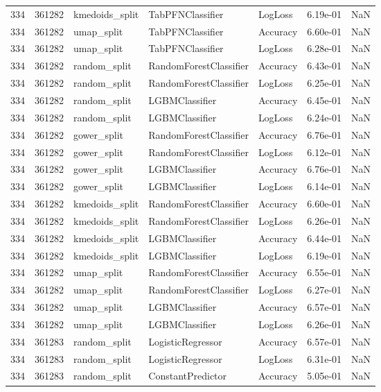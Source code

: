 \begin{tabular}{rrlllrr}
334 & 361282 & kmedoids\_split & TabPFNClassifier & LogLoss & 6.19e-01 & NaN \\
334 & 361282 & umap\_split & TabPFNClassifier & Accuracy & 6.60e-01 & NaN \\
334 & 361282 & umap\_split & TabPFNClassifier & LogLoss & 6.28e-01 & NaN \\
334 & 361282 & random\_split & RandomForestClassifier & Accuracy & 6.43e-01 & NaN \\
334 & 361282 & random\_split & RandomForestClassifier & LogLoss & 6.25e-01 & NaN \\
334 & 361282 & random\_split & LGBMClassifier & Accuracy & 6.45e-01 & NaN \\
334 & 361282 & random\_split & LGBMClassifier & LogLoss & 6.24e-01 & NaN \\
334 & 361282 & gower\_split & RandomForestClassifier & Accuracy & 6.76e-01 & NaN \\
334 & 361282 & gower\_split & RandomForestClassifier & LogLoss & 6.12e-01 & NaN \\
334 & 361282 & gower\_split & LGBMClassifier & Accuracy & 6.76e-01 & NaN \\
334 & 361282 & gower\_split & LGBMClassifier & LogLoss & 6.14e-01 & NaN \\
334 & 361282 & kmedoids\_split & RandomForestClassifier & Accuracy & 6.60e-01 & NaN \\
334 & 361282 & kmedoids\_split & RandomForestClassifier & LogLoss & 6.26e-01 & NaN \\
334 & 361282 & kmedoids\_split & LGBMClassifier & Accuracy & 6.44e-01 & NaN \\
334 & 361282 & kmedoids\_split & LGBMClassifier & LogLoss & 6.19e-01 & NaN \\
334 & 361282 & umap\_split & RandomForestClassifier & Accuracy & 6.55e-01 & NaN \\
334 & 361282 & umap\_split & RandomForestClassifier & LogLoss & 6.27e-01 & NaN \\
334 & 361282 & umap\_split & LGBMClassifier & Accuracy & 6.57e-01 & NaN \\
334 & 361282 & umap\_split & LGBMClassifier & LogLoss & 6.26e-01 & NaN \\
334 & 361283 & random\_split & LogisticRegressor & Accuracy & 6.57e-01 & NaN \\
334 & 361283 & random\_split & LogisticRegressor & LogLoss & 6.31e-01 & NaN \\
334 & 361283 & random\_split & ConstantPredictor & Accuracy & 5.05e-01 & NaN \\

\end{tabular}
